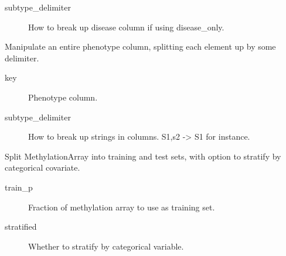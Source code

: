 \documentclass[letterpaper,10pt,english]{sphinxmanual}
\begin{document}
\begin{fulllineitems}
\begin{fulllineitems}
\begin{description}
\item[{subtype\_delimiter}] \leavevmode
How to break up disease column if using disease\_only.

\end{description}

\end{fulllineitems}


\begin{fulllineitems}
\label{\detokenize{index:pymethylprocess.MethylationDataTypes.MethylationArray.split_key}}
Manipulate an entire phenotype column, splitting each element up by some delimiter.
\begin{description}
\item[{key}] \leavevmode
Phenotype column.

\item[{subtype\_delimiter}] \leavevmode
How to break up strings in columns. S1,s2 -\textgreater{} S1 for instance.

\end{description}

\end{fulllineitems}


\begin{fulllineitems}
\label{\detokenize{index:pymethylprocess.MethylationDataTypes.MethylationArray.split_train_test}}
Split MethylationArray into training and test sets, with option to stratify by categorical covariate.
\begin{description}
\item[{train\_p}] \leavevmode
Fraction of methylation array to use as training set.

\item[{stratified}] \leavevmode
Whether to stratify by categorical variable.


\end{description}
\end{fulllineitems}
\end{fulllineitems}
\end{document}
